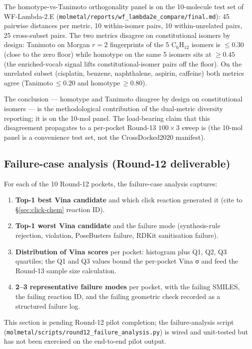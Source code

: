 {The homotype-vs-Tanimoto orthogonality panel is \MEASURED{} on
the 10-molecule test set of WF-Lambda-2.E
(\texttt{molmetal/reports/wf\_lambda2e\_compare/final.md}):
45 pairwise distances per metric, 10 within-isomer pairs, 10
within-unrelated pairs, 25 cross-subset pairs. The two metrics
disagree on constitutional isomers by design: Tanimoto on Morgan
$r{=}2$ fingerprints of the 5 C$_6$H$_{12}$ isomers is
$\leq 0.30$ (close to the zero floor) while homotype on the same
5 isomers sits at $\geq 0.45$ (the enriched-vocab signal lifts
constitutional-isomer pairs off the floor). On the unrelated
subset (cisplatin, benzene, naphthalene, aspirin, caffeine) both
metrics agree (Tanimoto\,$\leq 0.20$ and homotype\,$\geq 0.80$).

The conclusion --- homotype and Tanimoto disagree by design on
constitutional isomers --- is the methodological contribution of
the dual-metric diversity reporting; it is \MEASURED{} on the
10-mol panel. The load-bearing claim that this disagreement
propagates to a per-pocket Round-13 $100 \times 3$ sweep is
\DESIGN{} (the 10-mol panel is a convenience test set, not the
CrossDocked2020 manifest).

\subsection{Failure-case analysis (Round-12 deliverable)}
\label{sec:evaluation:failures}

For each of the 10 Round-12 pockets, the failure-case analysis
captures:
\begin{enumerate}
  \item \textbf{Top-1 best Vina candidate} and which click
        reaction generated it (cite to
        \S\ref{sec:click-chem} reaction ID).
  \item \textbf{Top-1 worst Vina candidate} and the failure mode
        (synthesis-rule rejection, \mgp{} violation, PoseBusters
        failure, RDKit sanitisation failure).
  \item \textbf{Distribution of Vina scores} per pocket:
        histogram plus Q1, Q2, Q3 quartiles; the Q1 and Q3 values
        bound the per-pocket Vina σ and feed the Round-13 sample
        size calculation.
  \item \textbf{2--3 representative failure modes} per pocket,
        with the failing SMILES, the failing reaction ID, and the
        failing geometric check recorded as a structured failure
        log.
\end{enumerate}
This section is \DESIGN{} pending Round-12 pilot completion;
the failure-analysis script
(\texttt{molmetal/scripts/round12\_failure\_analysis.py}) is
wired and unit-tested but has not been exercised on the
end-to-end pilot output.

}
